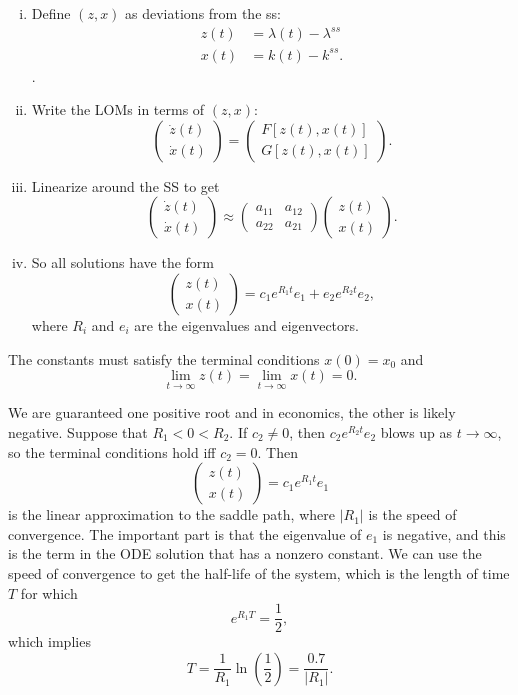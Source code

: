 \documentclass{tufte-handout}
\theoremstyle{definition}
\begin{document}
\begin{enumerate}[(i)]
	\item Define $(z,x)$ as deviations from the ss:
		\begin{align*}
			z(t) & = \lambda(t) - \lambda^{ss} \\
			x(t) &= k(t) - k^{ss}
		.\end{align*}.
	\item Write the LOMs in terms of $(z,x)$: \[
		\begin{pmatrix}
		\dot{z}(t) \\
		\dot{x}(t)
		\end{pmatrix} = \begin{pmatrix}
		F[z(t),x(t)]  \\
		G[z(t),x(t)]
		\end{pmatrix} 
	.\] 
	\item Linearize around the SS to get \[
		\begin{pmatrix}
		\dot{z}(t) \\
		\dot{x}(t)
		\end{pmatrix} \approx \begin{pmatrix}
		a_{11} & a_{12} \\
		a_{22} & a_{21}
		\end{pmatrix} \begin{pmatrix}
		z(t) \\
		x(t)
		\end{pmatrix} 
	.\] 
	\item So all solutions have the form \[
		\begin{pmatrix}
		z(t) \\
		x(t)
		\end{pmatrix} = c_1e^{R_1t}e_1 + e_2 e^{R_2 t}e_2
	,\] where $R_i$ and $e_i$ are the eigenvalues and eigenvectors.
\end{enumerate}

The constants must satisfy the terminal conditions $x(0) = x_0$ and \[
	\lim\limits_{t \to \infty} z(t) = \lim\limits_{t \to \infty} x(t) = 0
.\] 

We are guaranteed one positive root and in economics, the other is likely negative. Suppose that $R_1 < 0 < R_2$. If $c_2 \ne 0$, then $c_2 e^{R_2 t}e_2$ blows up as $t \to \infty$, so the terminal conditions hold iff $c_2 = 0$. Then \[
	\begin{pmatrix}
	z(t) \\
	x(t)
	\end{pmatrix} = c_1e^{R_1t}e_1
\] is the linear approximation to the saddle path, where $\left| R_1 \right|$ is the speed of convergence. The important part is that the eigenvalue of $e_1$ is negative, and this is the term in the ODE solution that has a nonzero constant. We can use the speed of convergence to get the half-life of the system, which is the length of time $T$ for which \[
	e^{R_1 T} = \frac{1}{2}
,\] which implies \[
	T = \frac{1}{R_1}\ln{(\frac{1}{2})} = \frac{0.7}{\left| R_1 \right|}
.\] 
\end{document}

